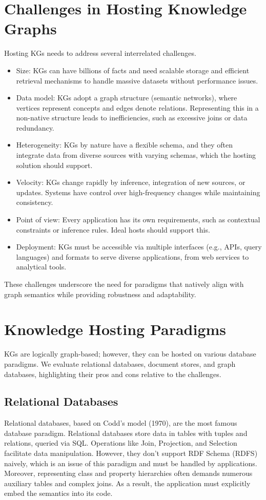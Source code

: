 \documentclass[12pt]{article}
\begin{document}
\section{Challenges in Hosting Knowledge Graphs}
Hosting KGs needs to address several interrelated challenges.
\begin{itemize}
    \item Size: KGs can have billions of facts and need scalable storage and efficient retrieval mechanisms to handle massive datasets without performance issues.
\item Data model: KGs adopt a graph structure (semantic networks), where vertices represent concepts and edges denote relations. Representing this in a non-native structure leads to inefficiencies, such as excessive joins or data redundancy.
\item Heterogeneity: KGs by nature have a flexible schema, and they often integrate data from diverse sources with varying schemas, which the hosting solution should support.
\item Velocity: KGs change rapidly by inference, integration of new sources, or updates. Systems have control over high-frequency changes while maintaining consistency.
\item Point of view: Every application has its own requirements, such as contextual constraints or inference rules. Ideal hosts should support this.
\item Deployment: KGs must be accessible via multiple interfaces (e.g., APIs, query languages) and formats to serve diverse applications, from web services to analytical tools.

\end{itemize}
These challenges underscore the need for paradigms that natively align with graph semantics while providing robustness and adaptability.
\section{Knowledge Hosting Paradigms}
KGs are logically graph-based; however, they can be hosted on various database paradigms. We evaluate relational databases, document stores, and graph databases, highlighting their pros and cons relative to the challenges.
\subsection{Relational Databases}
Relational databases, based on Codd's model (1970), are the most famous database paradigm. Relational databases store data in tables with tuples and relations, queried via SQL. Operations like Join, Projection, and Selection facilitate data manipulation. However, they don’t support RDF Schema (RDFS) naively, which is an issue of this paradigm and must be handled by applications. Moreover, representing class and property hierarchies often demands numerous auxiliary tables and complex joins. As a result, the application must explicitly embed the semantics into its code.
\end{document}
